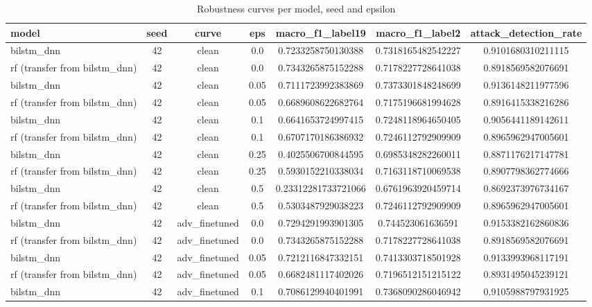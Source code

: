 \begin{table}[htbp]
\centering
\caption{Robustness curves per model, seed and epsilon}
\label{tab:robustness_curves}
\begin{tabular}{lcccccc}
\toprule
model & seed & curve & eps & macro\_f1\_label19 & macro\_f1\_label2 & attack\_detection\_rate \\
\midrule
bilstm\_dnn & 42 & clean & 0.0 & 0.7233258750130388 & 0.7318165482542227 & 0.9101680310211115 \\
rf (transfer from bilstm\_dnn) & 42 & clean & 0.0 & 0.7343265875152288 & 0.7178227728641038 & 0.8918569582076691 \\
bilstm\_dnn & 42 & clean & 0.05 & 0.7111723992383869 & 0.7373301848248699 & 0.9136148211977596 \\
rf (transfer from bilstm\_dnn) & 42 & clean & 0.05 & 0.6689608622682764 & 0.7175196681994628 & 0.8916415338216286 \\
bilstm\_dnn & 42 & clean & 0.1 & 0.6641653724997415 & 0.7248118964650405 & 0.9056441189142611 \\
rf (transfer from bilstm\_dnn) & 42 & clean & 0.1 & 0.6707170186386932 & 0.7246112792909909 & 0.8965962947005601 \\
bilstm\_dnn & 42 & clean & 0.25 & 0.4025506700844595 & 0.6985348282260011 & 0.8871176217147781 \\
rf (transfer from bilstm\_dnn) & 42 & clean & 0.25 & 0.5930152210338034 & 0.7163118710069538 & 0.8907798362774666 \\
bilstm\_dnn & 42 & clean & 0.5 & 0.23312281733721066 & 0.6761963920459714 & 0.8692373976734167 \\
rf (transfer from bilstm\_dnn) & 42 & clean & 0.5 & 0.5303487929038223 & 0.7246112792909909 & 0.8965962947005601 \\
bilstm\_dnn & 42 & adv\_finetuned & 0.0 & 0.7294291993901305 & 0.744523061636591 & 0.9153382162860836 \\
rf (transfer from bilstm\_dnn) & 42 & adv\_finetuned & 0.0 & 0.7343265875152288 & 0.7178227728641038 & 0.8918569582076691 \\
bilstm\_dnn & 42 & adv\_finetuned & 0.05 & 0.7212116847332151 & 0.7413303718501928 & 0.9133993968117191 \\
rf (transfer from bilstm\_dnn) & 42 & adv\_finetuned & 0.05 & 0.6682481117402026 & 0.7196512151215122 & 0.8931495045239121 \\
bilstm\_dnn & 42 & adv\_finetuned & 0.1 & 0.7086129940401991 & 0.7368090286046942 & 0.9105988797931925 \\

\end{tabular}
\end{table}
